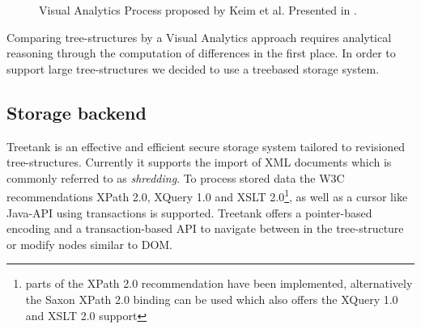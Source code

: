\begin{figure}[htb]
\caption{\label{fig:visualanalyticsprocess} Visual Analytics Process proposed by Keim et al. Presented in \cite{keim2008visual}.}
\end{figure}


Comparing tree-structures by a Visual Analytics approach requires analytical reasoning through the computation of differences in the first place. In order to support large tree-structures we decided to use a treebased storage system.

\subsection{Storage backend}
Treetank\cite{TREETANK} is an effective and efficient secure storage system tailored to revisioned tree-structures. Currently it supports the import of XML documents which is commonly referred to as \emph{shredding}. To process stored data the W3C recommendations XPath 2.0, XQuery 1.0 and XSLT 2.0\footnote{parts of the XPath 2.0 recommendation have been implemented, alternatively the Saxon XPath 2.0 binding can be used which also offers the XQuery 1.0 and XSLT 2.0 support}, as well as a cursor like Java-API using transactions is supported. Treetank offers a pointer-based encoding and a transaction-based API to navigate between in the tree-structure or modify nodes similar to DOM.

